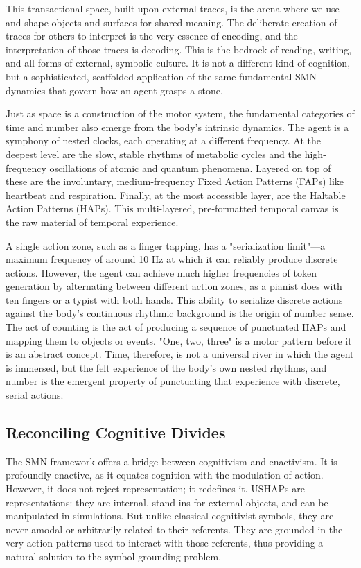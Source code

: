 This transactional space, built upon external traces, is the arena where we use and shape objects and surfaces for shared meaning. The deliberate creation of traces for others to interpret is the very essence of encoding, and the interpretation of those traces is decoding. This is the bedrock of reading, writing, and all forms of external, symbolic culture. It is not a different kind of cognition, but a sophisticated, scaffolded application of the same fundamental SMN dynamics that govern how an agent grasps a stone.


Just as space is a construction of the motor system, the fundamental categories of time and number also emerge from the body's intrinsic dynamics. The agent is a symphony of nested clocks, each operating at a different frequency. At the deepest level are the slow, stable rhythms of metabolic cycles and the high-frequency oscillations of atomic and quantum phenomena. Layered on top of these are the involuntary, medium-frequency Fixed Action Patterns (FAPs) like heartbeat and respiration. Finally, at the most accessible layer, are the Haltable Action Patterns (HAPs). This multi-layered, pre-formatted temporal canvas is the raw material of temporal experience.

A single action zone, such as a finger tapping, has a "serialization limit"—a maximum frequency of around 10 Hz at which it can reliably produce discrete actions. However, the agent can achieve much higher frequencies of token generation by alternating between different action zones, as a pianist does with ten fingers or a typist with both hands. This ability to serialize discrete actions against the body's continuous rhythmic background is the origin of number sense. The act of counting is the act of producing a sequence of punctuated HAPs and mapping them to objects or events. "One, two, three" is a motor pattern before it is an abstract concept. Time, therefore, is not a universal river in which the agent is immersed, but the felt experience of the body's own nested rhythms, and number is the emergent property of punctuating that experience with discrete, serial actions.

\subsection*{Reconciling Cognitive Divides}
The SMN framework offers a bridge between cognitivism and enactivism. It is profoundly enactive, as it equates cognition with the modulation of action. However, it does not reject representation; it redefines it. USHAPs are representations: they are internal, stand-ins for external objects, and can be manipulated in simulations. But unlike classical cognitivist symbols, they are never amodal or arbitrarily related to their referents. They are grounded in the very action patterns used to interact with those referents, thus providing a natural solution to the symbol grounding problem.

